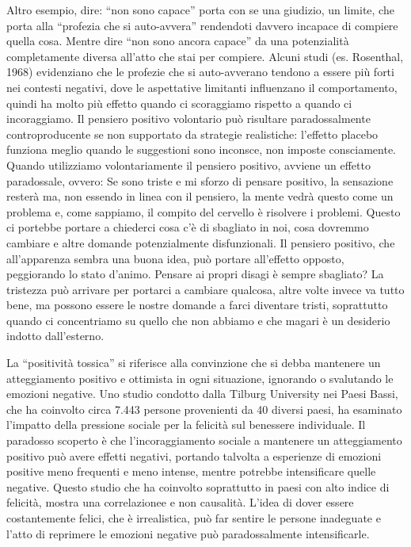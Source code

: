 \documentclass[12pt]{book} %
\begin{document}
Altro esempio, dire: “non sono capace” porta con se una giudizio, un limite, che porta alla “profezia che si
auto-avvera” rendendoti davvero incapace di compiere quella cosa. Mentre dire “non sono ancora capace” da una
potenzialità completamente diversa all'atto che stai per compiere. Alcuni studi (es. Rosenthal, 1968) evidenziano che le profezie che si auto-avverano tendono a essere più forti nei contesti negativi, dove le aspettative limitanti influenzano il comportamento, quindi ha molto più effetto quando ci scoraggiamo rispetto a quando ci incoraggiamo. Il pensiero positivo volontario può risultare paradossalmente controproducente se non supportato da strategie realistiche: l’effetto placebo funziona meglio quando le suggestioni sono inconsce, non imposte consciamente. Quando utilizziamo
volontariamente il pensiero positivo, avviene un effetto paradossale, ovvero: Se sono triste e mi sforzo di pensare
positivo, la sensazione resterà ma, non essendo in linea con il pensiero, la mente vedrà questo come un problema e,
come sappiamo, il compito del cervello è risolvere i problemi. Questo ci portebbe portare a chiederci cosa
c'è di sbagliato in noi, cosa dovremmo cambiare e altre domande potenzialmente disfunzionali. Il
pensiero positivo, che all'apparenza sembra una buona idea, può portare all'effetto
opposto, peggiorando lo stato d'animo. Pensare ai propri disagi è sempre sbagliato? La tristezza può arrivare per portarci a cambiare qualcosa, altre
volte invece va tutto bene, ma possono essere le nostre domande a farci diventare tristi, soprattutto quando ci concentriamo su
quello che non abbiamo e che magari è un desiderio indotto dall'esterno.

La “positività tossica” si riferisce alla convinzione che si debba mantenere un atteggiamento positivo e ottimista in ogni situazione, ignorando o svalutando le emozioni negative. Uno studio condotto dalla Tilburg University nei Paesi Bassi, che ha coinvolto circa 7.443 persone provenienti da 40 diversi paesi, ha esaminato l’impatto della pressione sociale per la felicità sul benessere individuale.
Il paradosso scoperto è che l’incoraggiamento sociale a mantenere un atteggiamento positivo può avere effetti negativi, portando talvolta a esperienze di emozioni positive meno frequenti e meno intense, mentre potrebbe intensificare quelle negative. Questo studio che ha coinvolto soprattutto in paesi con alto indice di felicità, mostra una correlazionee e non causalità. L’idea di dover essere costantemente felici, che è irrealistica, può far sentire le persone inadeguate e l’atto di reprimere le emozioni negative può paradossalmente intensificarle.
\end{document}
